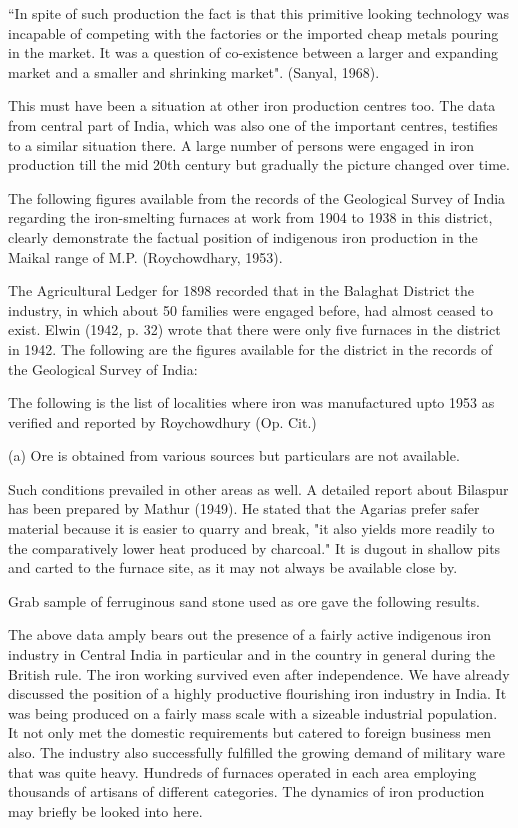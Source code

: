 “In spite of such production the fact is that this primitive looking technology was incapable of competing with the factories or the imported cheap metals pouring in the market. It was a question of co-existence between a larger and expanding market and a smaller and shrinking market". (Sanyal, 1968).

This must have been a situation at other iron production centres too. The data from central part of India, which was also one of the important centres, testifies to a similar situation there. A large number of persons were engaged in iron production till the mid 20th century but gradually the picture changed over time.

The following figures available from the records of the Geological Survey of India regarding the iron-smelting furnaces at work from 1904 to 1938 in this district, clearly demonstrate the factual position of indigenous iron production in the Maikal range of M.P. (Roychowdhary, 1953).

The Agricultural Ledger for 1898 recorded that in the Balaghat District the industry, in which about 50 families were engaged before, had almost ceased to exist. Elwin (1942\textit{, }p. 32) wrote that there were only five furnaces in the district in 1942. The following are the figures available for the district in the records of the Geological Survey of India:

The following is the list of localities where iron was manufactured upto 1953 as verified and reported by Roychowdhury (Op. Cit.)

(a) Ore is obtained from various sources but particulars are not available.

Such conditions prevailed in other areas as well. A detailed report about Bilaspur has been prepared by Mathur (1949). He stated that the Agarias prefer safer material because it is easier to quarry and break, "it also yields more readily to the comparatively lower heat produced by charcoal." It is dugout in shallow pits and carted to the furnace site, as it may not always be available close by.

Grab sample of ferruginous sand stone used as ore gave the following results.

The above data amply bears out the presence of a fairly active indigenous iron industry in Central India in particular and in the country in general during the British rule. The iron working survived even after independence. We have already discussed the position of a highly productive flourishing iron industry in India. It was being produced on a fairly mass scale with a sizeable industrial population. It not only met the domestic requirements but catered to foreign business men also. The industry also successfully fulfilled the growing demand of military ware that was quite heavy. Hundreds of furnaces operated in each area employing thousands of artisans of different categories. The dynamics of iron production may briefly be looked into here.

